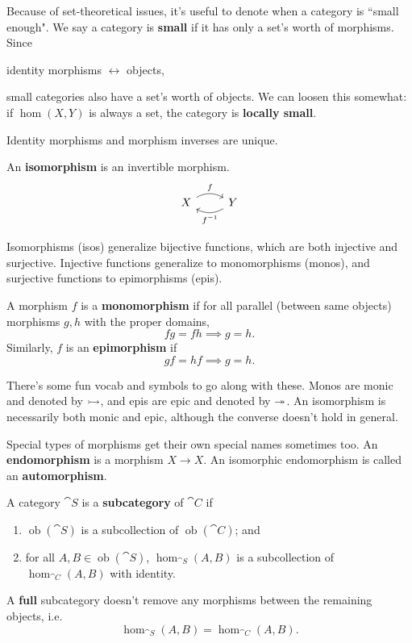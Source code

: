 \documentclass[twoside,10pt]{report}
\DeclareMathOperator{\ob}{ob}
\begin{document}
Because of set-theoretical issues, it's useful to denote when a category is ``small enough". We say a category is \textbf{small} if it has only a set's worth of morphisms. Since
\begin{center}
	identity morphisms $\leftrightarrow $ objects,
\end{center}
small categories also have a set's worth of objects. We can loosen this somewhat: if $\hom(X,Y)$ is always a set, the category is \textbf{locally small}.

\begin{prop}
Identity morphisms and morphism inverses are unique.
\end{prop}

\begin{defn}[]
An \textbf{isomorphism} is an invertible morphism.
\[
\begin{tikzcd}
	X \rar[bend left]{f} & Y \lar[bend left]{f^{-1}}
\end{tikzcd}
\] 
\end{defn}
Isomorphisms (isos) generalize bijective functions, which are both injective and surjective. Injective functions generalize to monomorphisms (monos), and surjective functions to epimorphisms (epis).
\begin{defn}[]
	A morphism $f$ is a \textbf{monomorphism} if for all parallel (between same objects) morphisms $g,h$ with the proper domains,
	\[
	fg = fh \implies g=h.
	\] Similarly, $f$ is an \textbf{epimorphism} if
	\[
	gf = hf \implies g=h.
	\] 
\end{defn}
There's some fun vocab and symbols to go along with these. Monos are monic and denoted by $\rightarrowtail$, and epis are epic and denoted by $\twoheadrightarrow$. An isomorphism is necessarily both monic and epic, although the converse doesn't hold in general.

Special types of morphisms get their own special names sometimes too. An \textbf{endomorphism} is a morphism $X\to X$. An isomorphic endomorphism is called an \textbf{automorphism}.
\begin{defn}
	A category $\cat{S}$ is a \textbf{subcategory} of $\cat{C}$ if
	\begin{enumerate}
		\item $\ob(\cat{S})$ is a subcollection of $\ob(\cat{C})$; and
		\item for all $A, B \in \ob(\cat{S})$, $\hom_{\cat{S}}(A,B)$ is a subcollection of $\hom_{\cat{C}}(A,B)$ with identity.
	\end{enumerate}
\end{defn}
A \textbf{full} subcategory doesn't remove any morphisms between the remaining objects, i.e.
\[
	\hom_{\cat{S} }(A,B) = \hom_{\cat{C} }(A,B).
\]
\end{document}
